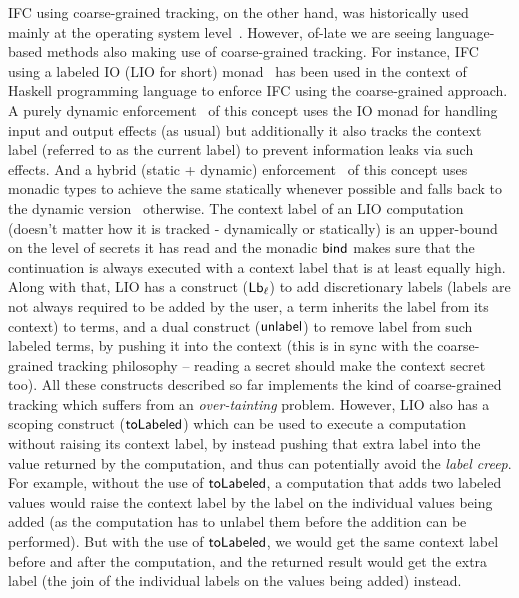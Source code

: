 IFC using coarse-grained tracking, on the other hand, was historically used mainly at the operating
system level~\cite{sosp05-asbestosOS,osdi06-histarOS,sosp07-flumeOS}. However, of-late we are seeing
language-based methods also making use of coarse-grained tracking. For instance, IFC using a labeled
IO (LIO for short) monad~\cite{haskell11-LIO,icfp15-HLIO} has been used in the context of Haskell
programming language to enforce IFC using the coarse-grained approach. A purely dynamic
enforcement~\cite{haskell11-LIO} of this concept uses the IO monad for handling input and output
effects (as usual) but additionally it also tracks the context label (referred to as the current
label) to prevent information leaks via such effects. And a hybrid (static + dynamic)
enforcement~\cite{icfp15-HLIO} of this concept uses monadic types to achieve the same statically
whenever possible and falls back to the dynamic version~\cite{haskell11-LIO} otherwise. The context
label of an LIO computation (doesn't matter how it is tracked - dynamically or statically) is an
upper-bound on the level of secrets it has read and the monadic $\mathsf{bind}$ makes sure that the
continuation is always executed with a context label that is at least equally high. Along with that,
LIO has a construct ($\mathsf{Lb}_{\ell}$) to add discretionary labels (labels are not always
required to be added by the user, a term inherits the label from its context) to terms, and a dual
construct ($\mathsf{unlabel}$) to remove label from such labeled terms, by pushing it into the context
(this is in sync with the coarse-grained tracking philosophy -- reading a secret should make the
context secret too). All these constructs described so far implements the kind of coarse-grained
tracking which suffers from an \textit{over-tainting} problem. However, LIO also has a scoping
construct ($\mathsf{toLabeled}$) which can be used to execute a computation without raising its context
label, by instead pushing that extra label into the value returned by the computation, and thus can
potentially avoid the \textit{label creep}. For example, without the use of $\mathsf{toLabeled}$, a
computation that adds two labeled values would raise the context label by the label on the
individual values being added (as the computation has to unlabel them before the addition can be
performed). But with the use of $\mathsf{toLabeled}$, we would get the same context label before and after
the computation, and the returned result would get the extra label (the join of the individual
labels on the values being added) instead.

